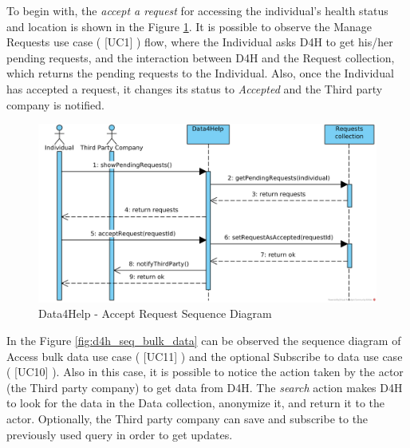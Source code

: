 \documentclass[a4paper, hidelinks, 12pt]{report}
\newcommand\usecase[1]{ [UC#1] }
\begin{document}
	To begin with, the \textit{accept a request} for accessing the individual's health status and location is shown in the Figure \ref{fig:d4h_seq_accept_request}. It is possible to observe the Manage Requests use case (\usecase{1}) flow, where the Individual asks D4H to get his/her pending requests, and the interaction between D4H and the Request collection, which returns the pending requests to the Individual. Also, once the Individual has accepted a request, it changes its status to \textit{Accepted} and the Third party company is notified. \\
	
	\begin{figure}[H]
		\centering
		\includegraphics[width=1\textwidth]{Diagrams/d4h_seq_accept_request.png}
		\caption[Data4Help - Accept Request Sequence Diagram]{Data4Help - Accept Request Sequence Diagram}
		\label{fig:d4h_seq_accept_request}
	\end{figure}
	
	In the Figure \ref{fig:d4h_seq_bulk_data} can be observed the sequence diagram of Access bulk data use case (\usecase{11}) and the optional Subscribe to data use case (\usecase{10}). Also in this case, it is possible to notice the action taken by the actor (the Third party company) to get data from D4H. The \textit{search} action makes D4H to look for the data in the Data collection, anonymize it, and return it to the actor. Optionally, the Third party company can save and subscribe to the previously used query in order to get updates.\\
	
\end{document}
